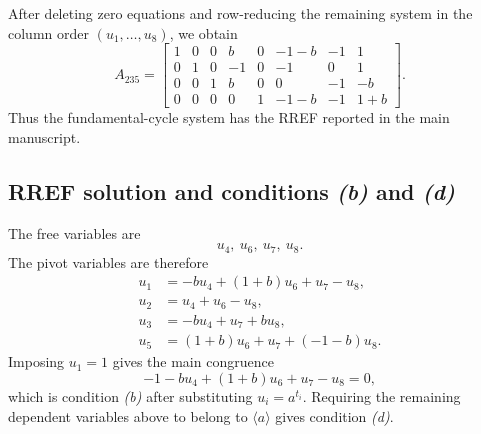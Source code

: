 \documentclass[11pt]{article}
\newcommand{\SpanA}{\langle a\rangle}
\begin{document}
After deleting zero equations and row-reducing the remaining system in the column order $(u_1,\ldots,u_8)$, we obtain
\[
A_{235}=
\begin{bmatrix}
1 & 0 & 0 & b & 0 & -1 - b & -1 & 1 \\
0 & 1 & 0 & -1 & 0 & -1 & 0 & 1 \\
0 & 0 & 1 & b & 0 & 0 & -1 & -b \\
0 & 0 & 0 & 0 & 1 & -1 - b & -1 & 1 + b
\end{bmatrix}.
\]
Thus the fundamental-cycle system has the RREF reported in the main manuscript.

\subsection{RREF solution and conditions \emph{(b)} and \emph{(d)}}
The free variables are
\[
u_{4},\ u_{6},\ u_{7},\ u_{8}.
\]
The pivot variables are therefore
\[
\begin{aligned}
u_{1}&=-bu_{4} + \left(1 + b\right)u_{6} + u_{7} - u_{8},\\
u_{2}&=u_{4} + u_{6} - u_{8},\\
u_{3}&=-bu_{4} + u_{7} + bu_{8},\\
u_{5}&=\left(1 + b\right)u_{6} + u_{7} + \left(-1 - b\right)u_{8}.
\end{aligned}
\]
Imposing $u_1=1$ gives the main congruence
\[
-1 - bu_{4} + \left(1 + b\right)u_{6} + u_{7} - u_{8}=0,
\]
which is condition \emph{(b)} after substituting $u_i=a^{t_i}$.  Requiring the remaining dependent variables above to belong to $\SpanA$ gives condition \emph{(d)}.
\end{document}
